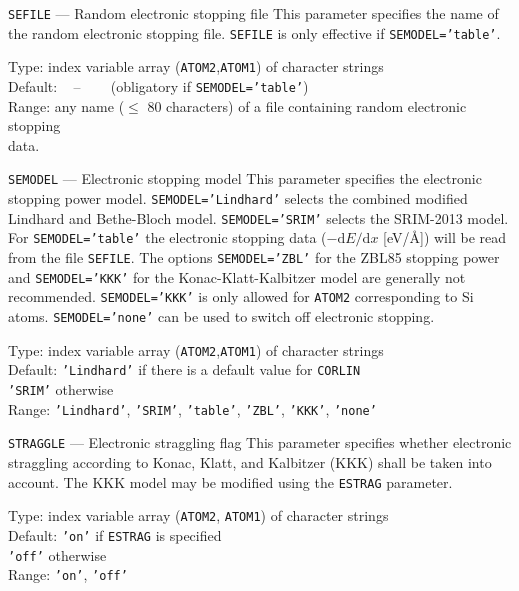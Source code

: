 \begin{keydescription}{\texttt{SEFILE} --- Random electronic stopping file}
%
  This parameter specifies the name of the random electronic stopping
  file. \texttt{SEFILE} is only effective if \texttt{SEMODEL='table'}.
  \begin{keytab}
    Type:    \> index variable array (\texttt{ATOM2},\texttt{ATOM1}) 
                of character strings \\
    Default: \> ~ -- ~~~ (obligatory if \texttt{SEMODEL='table'}) \\
    Range:   \> any name ($\le$ 80 characters) of a file containing random
    electronic stopping \\
             \>data.
  \end{keytab}
\end{keydescription}

\begin{keydescription}{\texttt{SEMODEL} --- Electronic stopping model}
%
  This parameter specifies the electronic stopping power model.  
  \texttt{SEMODEL='Lindhard'} selects the combined modified Lindhard and
  Bethe-Bloch model. 
  \texttt{SEMODEL='SRIM'} selects the SRIM-2013 model.
  For \texttt{SEMODEL='table'} the electronic stopping data 
  ($-\mathrm{d}E/\mathrm{d}x$ [eV/\AA]) will be read from the file 
  \texttt{SEFILE}.
  The options \texttt{SEMODEL='ZBL'} for the ZBL85 stopping power and 
  \texttt{SEMODEL='KKK'} for the Konac-Klatt-Kalbitzer model are generally
  not recommended.
  \texttt{SEMODEL='KKK'} is only allowed for \texttt{ATOM2} corresponding to 
  Si atoms.
  \texttt{SEMODEL='none'} can be used to switch off electronic stopping.  
  \begin{keytab}
    Type:    \> index variable array (\texttt{ATOM2},\texttt{ATOM1}) 
                of character strings \\
    Default: \> \texttt{'Lindhard'} if there is a default value for 
                \texttt{CORLIN} \\
             \> \texttt{'SRIM'} otherwise \\
    Range:   \> \texttt{'Lindhard'}, \texttt{'SRIM'}, \texttt{'table'},
                \texttt{'ZBL'}, \texttt{'KKK'}, \texttt{'none'}
  \end{keytab}
\end{keydescription}

\begin{keydescription}{\texttt{STRAGGLE} --- Electronic straggling flag}
%
  This parameter specifies whether electronic straggling according to
  Konac, Klatt, and Kalbitzer (KKK) shall be taken into account. The
  KKK model may be modified using the \texttt{ESTRAG} parameter.
  \begin{keytab}
    Type:    \> index variable array (\texttt{ATOM2}, \texttt{ATOM1})
                of character strings \\
    Default: \> \texttt{'on'} if \texttt{ESTRAG} is specified \\
             \> \texttt{'off'} otherwise \\
    Range:   \> \texttt{'on'}, \texttt{'off'}
  \end{keytab}
\end{keydescription}


